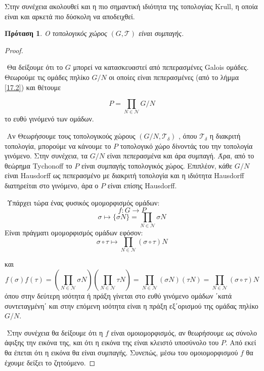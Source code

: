 \documentclass[oneside,a4paper]{article}
\newtheorem{prop}{Πρόταση}
\newcommand {\tl}{\textlatin}
\begin{document}
\noindent Στην συνέχεια ακολουθεί και η πιο σημαντική ιδιότητα της τοπολογίας \tl{Krull}, η οποία είναι και αρκετά πιο δύσκολη να αποδειχθεί.
\begin{prop}O τοπολογικός χώρος $(G, \mathcal{T})$ είναι συμπαγής.
\end{prop}
\begin{proof} $ $


$ $\newline
Θα δείξουμε ότι το $G$ μπορεί να κατασκευαστεί από πεπερασμένες \tl{Galois} ομάδες. Θεωρούμε τις ομάδες πηλίκο $G/N$ οι οποίες είναι πεπερασμένες (από το λήμμα \ref{17.2}) και θέτουμε

$$P = \prod\limits_{N \in \mathcal{N}} G/N$$
το ευθύ γινόμενό των ομάδων.

$ $\newline
\noindent Αν Θεωρήσουμε τους τοπολογικούς χώρους $(G/N, \mathcal{T}_{\delta})$ , όπου $\mathcal{T}_{\delta}$ η διακριτή τοπολογία, μπορούμε να κάνουμε το $P$ τοπολογικό χώρο δίνοντάς του την τοπολογία γινόμενο. Στην συνέχεια, τα $G/N$ είναι πεπερασμένα και άρα συμπαγή. Άρα, από το θεώρημα \tl{Tychonoff} το $P$ είναι συμπαγής τοπολογικός χώρος. Επιπλέον, κάθε $G/N$ είναι \tl{Hausdorff} ως πεπερασμένο με διακριτή τοπολογία και η ιδιότητα \tl{Hausdorff} διατηρείται στο γινόμενο, άρα ο $P$ είναι επίσης \tl{Hausdorff}.

$ $\newline
\noindent Υπάρχει τώρα ένας φυσικός ομομορφισμός ομάδων:
$$f:G \longrightarrow P$$
$$\sigma \longmapsto \{\sigma N \} = \prod\limits_{N \in \mathcal{N}} \sigma N$$
Είναι πράγματι ομομορφισμός ομάδων εφόσον:
$$\sigma \circ \tau \longmapsto \prod\limits_{N \in \mathcal{N}} (\sigma \circ \tau) N$$

και 
$$f(\sigma)f(\tau) = \left( \prod\limits_{N \in \mathcal{N}} \sigma N \right) \left(\prod\limits_{N \in \mathcal{N}}\tau N \right) = \prod\limits_{N \in \mathcal{N}} (\sigma N)(\tau N) = \prod\limits_{N \in \mathcal{N}} (\sigma \circ \tau)N$$
όπου στην δεύτερη ισότητα ή πράξη γίνεται στο ευθύ γινόμενο ομάδων ΄κατά συντεταγμένη΄ και στην επόμενη ισότητα είναι η πράξη εξ΄ορισμού της ομάδας πηλίκο $G/N$.

$ $\newline
\noindent Στην συνέχεια θα δείξουμε ότι η $f$ είναι ομοιομορφισμός, αν θεωρήσουμε ως σύνολο άφιξης
την εικόνα της, και ότι η εικόνα της είναι κλειστό υποσύνολο του $P$. Από εκεί θα έπεται ότι η εικόνα θα είναι συμπαγής. Συνεπώς, μέσω του ομοιομορφισμού $f$ θα έχουμε δείξει το ζητούμενο.


\end{proof}
\end{document}

